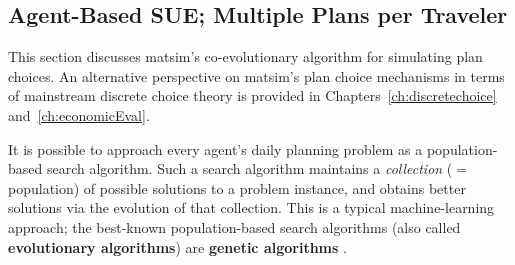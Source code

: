 \subsection{Agent-Based SUE; Multiple Plans per Traveler}
\label{sec:agent-based-sue}

This section discusses \gls{matsim}'s co-evolutionary algorithm for simulating
plan choices. An alternative perspective on \gls{matsim}'s plan choice mechanisms
in terms of mainstream discrete choice theory \citep{BenAkivaLerman_1985} is
provided in Chapters~\ref{ch:discretechoice} and~\ref{ch:economicEval}.

% 

It is possible to approach every agent's daily
planning problem as a population-based search algorithm.  Such a
search algorithm maintains a \emph{collection} ($=$ population) of
possible solutions to a problem instance, and obtains better solutions
via the evolution of that collection.  This is a typical
machine-learning \citep[e.g.][]{RussellNorvigBook} approach; the best-known
population-based search algorithms (also called \textbf{evolutionary
algorithms}) are \textbf{genetic algorithms} \citep[e.g.,][]{Goldberg_1989}.

